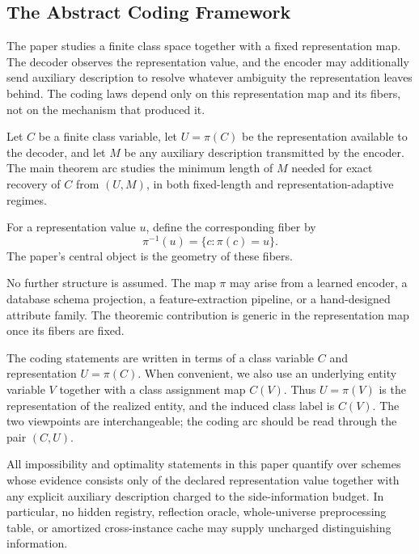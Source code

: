 \subsection{The Abstract Coding Framework}

The paper studies a finite class space together with a fixed representation map. The decoder observes the representation value, and the encoder may additionally send auxiliary description to resolve whatever ambiguity the representation leaves behind. The coding laws depend only on this representation map and its fibers, not on the mechanism that produced it.

\begin{definition}
Let $C$ be a finite class variable, let $U=\pi(C)$ be the representation available to the decoder, and let $M$ be any auxiliary description transmitted by the encoder. The main theorem arc studies the minimum length of $M$ needed for exact recovery of $C$ from $(U,M)$, in both fixed-length and representation-adaptive regimes.
\end{definition}

\begin{definition}
For a representation value $u$, define the corresponding fiber by
\[
\pi^{-1}(u) = \{c : \pi(c)=u\}.
\]
The paper's central object is the geometry of these fibers.
\end{definition}

\begin{remark}
No further structure is assumed. The map $\pi$ may arise from a learned encoder, a database schema projection, a feature-extraction pipeline, or a hand-designed attribute family. The theoremic contribution is generic in the representation map once its fibers are fixed.
\end{remark}

\begin{remark}
The coding statements are written in terms of a class variable $C$ and representation $U=\pi(C)$. When convenient, we also use an underlying entity variable $V$ together with a class assignment map $C(V)$. Thus $U=\pi(V)$ is the representation of the realized entity, and the induced class label is $C(V)$. The two viewpoints are interchangeable; the coding arc should be read through the pair $(C,U)$.
\end{remark}

\begin{definition}\label{def:admissibility-contract}
All impossibility and optimality statements in this paper quantify over schemes whose evidence consists only of the declared representation value together with any explicit auxiliary description charged to the side-information budget. In particular, no hidden registry, reflection oracle, whole-universe preprocessing table, or amortized cross-instance cache may supply uncharged distinguishing information.
\end{definition}

